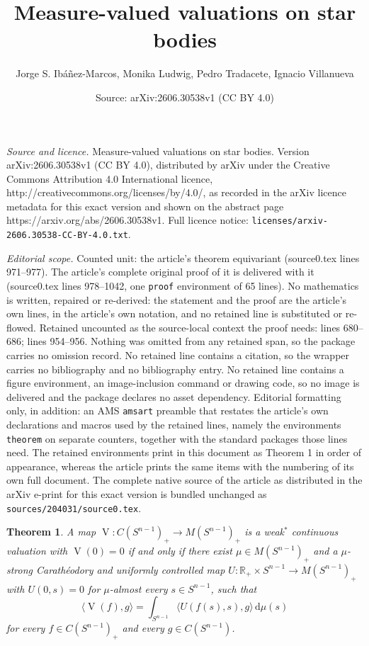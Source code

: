 \documentclass[10pt,a4paper]{amsart}
\title{Measure-valued valuations on star bodies}
\author{Jorge S. Ib\'a\~nez-Marcos, Monika Ludwig, Pedro Tradacete, Ignacio Villanueva}
\date{Source: arXiv:2606.30538v1 (CC BY 4.0)}
\newtheorem{theorem}{Theorem}
\newcommand{\cfn}{C(\sn )_{\scriptscriptstyle +}}
\renewcommand{\d}{\,\mathrm{d}}
\newcommand{\measn}{M(\sn )_{\scriptscriptstyle +}}
\newcommand{\oV}{\operatorname{V}}
\newcommand{\rp}{\mathbb R_{\scriptscriptstyle +}}
\newcommand{\sn}{{S^{n-1}}}
\newcommand{\somename}{strong Cara\-th\'eo\-dory and uniformly controlled }
\begin{document}
\maketitle

\noindent\emph{Source and licence.} Measure-valued valuations on star bodies. Version arXiv:2606.30538v1 (CC BY 4.0), distributed by arXiv under the Creative Commons Attribution 4.0 International licence, http://creativecommons.org/licenses/by/4.0/, as recorded in the arXiv licence metadata for this exact version and shown on the abstract page https://arxiv.org/abs/2606.30538v1. Full licence notice: \texttt{licenses/arxiv-2606.30538-CC-BY-4.0.txt}.\par\smallskip

\noindent\textit{Editorial scope.} Counted unit: the article's theorem equivariant (source0.tex lines 971--977). The article's complete original proof of it is delivered with it (source0.tex lines 978--1042, one \texttt{proof} environment of 65 lines). No mathematics is written, repaired or re-derived: the statement and the proof are the article's own lines, in the article's own notation, and no retained line is substituted or re-flowed.  Retained uncounted as the source-local context the proof needs: lines 680--686; lines 954--956.  Nothing was omitted from any retained span, so the package carries no omission record.  No retained line contains a citation, so the wrapper carries no bibliography and no bibliography entry.  No retained line contains a figure environment, an image-inclusion command or drawing code, so no image is delivered and the package declares no asset dependency.  Editorial formatting only, in addition: an AMS \texttt{amsart} preamble that restates the article's own declarations and macros used by the retained lines, namely the environments \texttt{theorem} on separate counters, together with the standard packages those lines need.  The retained environments print in this document as Theorem 1 in order of appearance, whereas the article prints the same items with the numbering of its own full document.  The complete native source of the article as distributed in the arXiv e-print for this exact version is bundled unchanged as \texttt{sources/204031/source0.tex}.
\begin{theorem}\label{th:representation}
A map $\oV\colon  \cfn\to \measn$ is a weak$^*$\! continuous valuation with $\oV(0)=0$ if and only if there exist $\mu\in \measn$ and a $\mu$-\somename map $U\colon \rp \times \sn  \to \measn$ with $U(0,s)=0$ for $\mu$-almost every $s\in \sn$, such that
\begin{equation}\label{eq_equality}
\langle \oV(f),g\rangle = \int_{\sn } \langle U(f(s), s),g\rangle \d\mu(s)
\end{equation}
for every $f\in\cfn$ and every $g\in C(\sn)$. 
\end{theorem}
\end{document}
